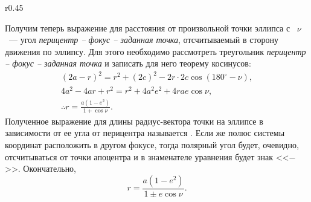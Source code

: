 \begin{wrapfigure}{r}{0.45\tw}
    \centering
    \caption{}
\end{wrapfigure}
Получим теперь выражение для расстояния от произвольной точки эллипса с ~$\nu$~--- угол
{\slshape перицентр -- фокус -- заданная точка},
отсчитываемый в сторону движения по эллипсу. Для этого необходимо рассмотреть треугольник {\slshape перицентр -- фокус -- заданная точка} и записать для него теорему косинусов:
\begin{gather*}
    (2a - r)^2 = r^2 + (2c)^2 - 2 r \cdot 2c \cos (180^\circ - \nu),\\
    4a^2 - 4ar + r^2 = r^2 + 4 a^2 e^2 + 4 r a e \cos \nu,\\
    \therefore r = \frac{a(1 - e^2)}{1 + \cos \nu}.
\end{gather*}
Полученное выражение для длины радиус-вектора точки на эллипсе в зависимости от ее угла от перицентра называется . Если же полюс системы координат расположить в другом фокусе, тогда полярный угол будет, очевидно, отсчитываться от точки апоцентра и в знаменателе уравнения будет знак <<$-$>>. Окончательно,
\begin{equation}
    r = \frac{a ( 1- e^2)}{1 \pm e \cos \nu}.
    \label{eq:ell-eq-pol}
\end{equation}


